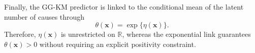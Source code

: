 {	Finally, the GG-KM predictor is linked to the conditional mean of the
	latent number of causes through
	\begin{equation}
	    \theta(\bm{x})
	    =
	    \exp\{\eta(\bm{x})\}.
	    \label{eq:theta-link}
	\end{equation}
	Therefore, $\eta(\bm{x})$ is unrestricted on $\mathbb R$, whereas the
	exponential link guarantees $\theta(\bm{x})>0$ without requiring an
	explicit positivity constraint.






}
